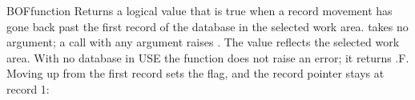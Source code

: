 \begin{XbaseEntry}{BOF}{function}
Returns a logical value that is true when a record movement has gone back past the first record of the database in the selected work area.
\Syntax
{}
\Usage
{} takes no argument; a call with any argument raises . The value reflects the selected work area. With no database in USE the function does not raise an error; it returns .F.
\Examples
Moving up from the first record sets the flag, and the record pointer stays at record 1:
\end{XbaseEntry}

